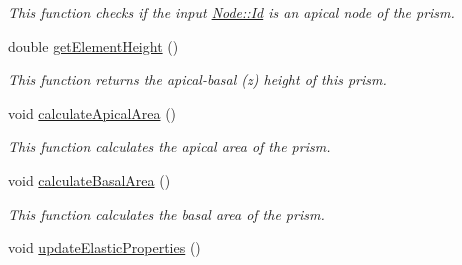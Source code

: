 \begin{DoxyCompactItemize}
\begin{DoxyCompactList}\small\item\em This function checks if the input \hyperlink{classNode_a1bd379569cc1a8b96432e61971aed4d9}{Node\+::\+Id} is an apical node of the prism. \end{DoxyCompactList}\item 
\hypertarget{classPrism_a91d08cfcf6bf111f5d9e314499bafd11}{}double \hyperlink{classPrism_a91d08cfcf6bf111f5d9e314499bafd11}{get\+Element\+Height} ()\label{classPrism_a91d08cfcf6bf111f5d9e314499bafd11}

\begin{DoxyCompactList}\small\item\em This function returns the apical-\/basal (z) height of this prism. \end{DoxyCompactList}\item 
\hypertarget{classPrism_a67e80515fb1cdf4438b4b7d47334bd2e}{}void \hyperlink{classPrism_a67e80515fb1cdf4438b4b7d47334bd2e}{calculate\+Apical\+Area} ()\label{classPrism_a67e80515fb1cdf4438b4b7d47334bd2e}

\begin{DoxyCompactList}\small\item\em This function calculates the apical area of the prism. \end{DoxyCompactList}\item 
\hypertarget{classPrism_aa8dd4b90cdaecdbabfb48f45a9bcdc95}{}void \hyperlink{classPrism_aa8dd4b90cdaecdbabfb48f45a9bcdc95}{calculate\+Basal\+Area} ()\label{classPrism_aa8dd4b90cdaecdbabfb48f45a9bcdc95}

\begin{DoxyCompactList}\small\item\em This function calculates the basal area of the prism. \end{DoxyCompactList}\item 
\hypertarget{classPrism_ace69b0f46bcd14fed2413fa2e24701e4}{}void \hyperlink{classPrism_ace69b0f46bcd14fed2413fa2e24701e4}{update\+Elastic\+Properties} ()\label{classPrism_ace69b0f46bcd14fed2413fa2e24701e4}


\end{DoxyCompactItemize}
